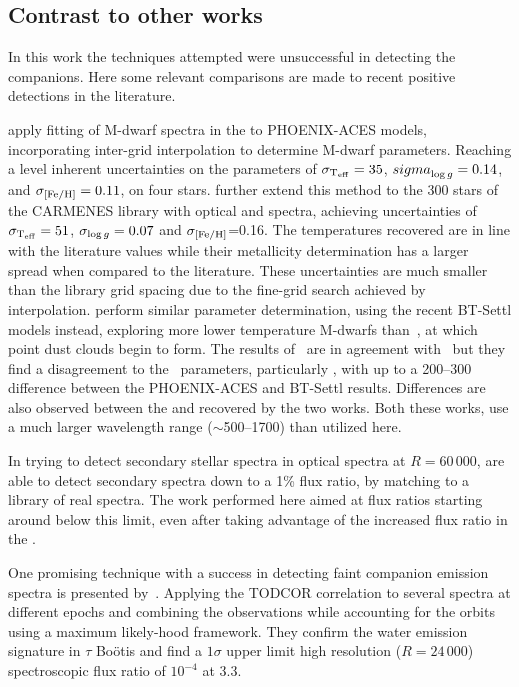 \subsection{Contrast to other works}
\label{subsec:chi2_contrast}
In this work the techniques attempted were unsuccessful in detecting the companions.
Here some relevant comparisons are made to recent positive detections in the literature.

\citet{passegger_fundamental_2016} apply \textchisquared{} fitting of {M-dwarf} spectra in the \nir{} to {PHOENIX-ACES} models, incorporating inter-grid interpolation to determine {M-dwarf} parameters.
Reaching a level inherent uncertainties on the parameters of \({\sigma}_{\textrm{T}_{\mathrm{eff}}}= 35\)\K{}, \({sigma}_{\log{g}{}} = 0.14\), and \({\sigma}_{\feh{}}= 0.11\), on four stars.
\citet{passegger_carmenes_2018} further extend this method to the 300 stars of the {CARMENES} library with optical and \nir{} spectra, achieving uncertainties of \({\sigma}_{\textrm{T}_{\mathrm{eff}}{}}=51\)\K{}, \({\sigma}_{\log{g}{}}=0.07\) and \({\sigma}_{\feh{}}\)=0.16.
The temperatures recovered are in line with the literature values while their metallicity determination has a larger spread when compared to the literature.
These uncertainties are much smaller than the library grid spacing due to the fine-grid search achieved by interpolation.
\citet{rajpurohit_exploring_2018} perform similar parameter determination, using the recent {BT-Settl} models instead, exploring more lower temperature M-dwarfs than~\citet{passegger_carmenes_2018}, at which point dust clouds begin to form.
The results of~\citet{rajpurohit_exploring_2018} are in agreement with~\citep{gaidos_dwarf_2014} but they find a disagreement to the~\citet{passegger_carmenes_2018} parameters, particularly \Teff{}, with up to a 200--300\K{} difference between the {PHOENIX-ACES} and {BT-Settl} results.
Differences are also observed between the \Logg{} and \feh{} recovered by the two works.
Both these works, use a much larger wavelength range (\(\sim\)500--1700\nm{}) than utilized here.

In trying to detect secondary stellar spectra in optical spectra at \(R=60\,000\), \citep{kolbl_detection_2015} are able to detect secondary spectra down to a 1\% flux ratio, by matching to a library of real spectra.
The work performed here aimed at flux ratios starting around below this limit, even after taking advantage of the increased flux ratio in the \nir{}.

One promising technique with a success in detecting faint companion emission spectra is presented by~\citet{lockwood_nearir_2014}.
Applying the {TODCOR} correlation to several spectra at different epochs and combining the observations while accounting for the orbits using a maximum likely-hood framework.
They confirm the water emission signature in {\(\tau\) Bo\"{o}tis} and find a \(1\sigma\) upper limit high resolution (\(R=24\,000\)) spectroscopic flux ratio of \(10^{-4}\) at 3.3\um{}.

